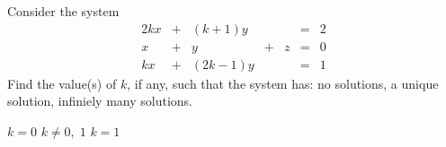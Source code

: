 
\begin{Exercise}[name={},
title={}, 
origin={\cite{BS}},
counter=Exercise]
Consider the system
\[
\begin{array}{rrrrrrrr}
2kx & + & (k+1)y & & & =& 2\\
x   & + & y & + & z & =&  0\\
kx  & + & (2k-1)y& & & =&  1
\end{array}
\]
Find the value(s) of $k$, if any, such that the system has:
\Question no solutions,
\Question a unique solution, 
\Question infiniely many solutions.
\end{Exercise}

\begin{Answer}
\begin{multicols}{3}
\Question $k=0$
\Question $k\neq 0,\; 1$
\Question $k=1$
\EndCurrentQuestion
\end{multicols}
\end{Answer}

